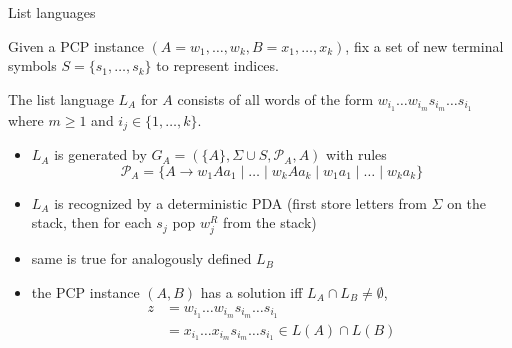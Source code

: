 \documentclass[handout]{beamer}
\begin{document}
\begin{frame}{List languages}

    Given a PCP instance $(A=w_1,\ldots, w_k,B=x_1,\ldots, x_k)$, fix a set of new terminal symbols $S=\{s_1,\dots,s_k\}$ to represent indices.

    The \alert{list language $L_A$} for $A$ consists of all words of the form $w_{i_1}\dots w_{i_m}s_{i_m}\dots s_{i_1}$ where $m\geq 1$ and $i_j\in\{1,\dots,k\}$.

    \begin{itemize}
        \item $L_A$ is generated by $G_A=(\{A\},\Sigma\cup S,\mathcal P_A,A)$ with rules
        $$
        \mathcal P_A=\{A\to w_1 A a_1\mid\dots\mid w_k A a_k\mid w_1 a_1 \mid\dots\mid w_k a_k\}
        $$
        \item $L_A$ is recognized by a deterministic PDA (first store letters from $\Sigma$ on the stack, then for each $s_j$ pop $w_j^R$ from the stack)
        \item same is true for analogously defined \alert{$L_B$}
        \item the PCP instance $(A,B)$ has a solution iff $L_A\cap L_B\neq\emptyset$,
        \begin{align*}
            z&=w_{i_1}\dots w_{i_m}s_{i_m}\dots s_{i_1}\\
             &=x_{i_1}\dots x_{i_m}s_{i_m}\dots s_{i_1}\in L(A)\cap L(B)
        \end{align*}        

    \end{itemize}
    
\end{frame}
\end{document}
